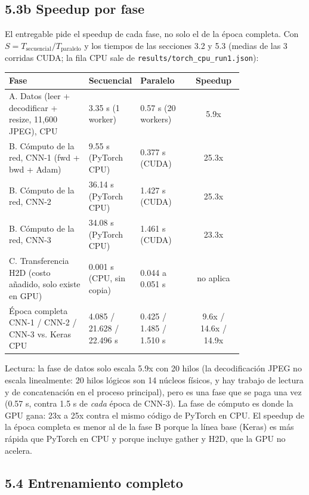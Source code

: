 \documentclass[
  11pt,
]{article}
\begin{document}
\subsection{5.3b Speedup por fase}\label{speedup-por-fase}

El entregable pide el speedup de cada fase, no solo el de la época completa. Con
\(S = T_{\text{secuencial}} / T_{\text{paralelo}}\) y los tiempos de las secciones 3.2 y 5.3
(medias de las 3 corridas CUDA; la fila CPU sale de \texttt{results/torch\_cpu\_run1.json}):

\begin{longtable}[]{@{}p{0.34\linewidth}p{0.22\linewidth}p{0.22\linewidth}c@{}}
\toprule\noalign{}
Fase & Secuencial & Paralelo & Speedup \\
\midrule\noalign{}
\endhead
\bottomrule\noalign{}
\endlastfoot
A. Datos (leer + decodificar + resize, 11,600 JPEG), CPU & 3.35 s (1 worker) & 0.57 s (20 workers) & 5.9x \\
B. Cómputo de la red, CNN-1 (fwd + bwd + Adam) & 9.55 s (PyTorch CPU) & 0.377 s (CUDA) & 25.3x \\
B. Cómputo de la red, CNN-2 & 36.14 s (PyTorch CPU) & 1.427 s (CUDA) & 25.3x \\
B. Cómputo de la red, CNN-3 & 34.08 s (PyTorch CPU) & 1.461 s (CUDA) & 23.3x \\
C. Transferencia H2D (costo añadido, solo existe en GPU) & 0.001 s (CPU, sin copia) & 0.044 a 0.051 s & no aplica \\
Época completa CNN-1 / CNN-2 / CNN-3 vs. Keras CPU & 4.085 / 21.628 / 22.496 s & 0.425 / 1.485 / 1.510 s & 9.6x / 14.6x / 14.9x \\
\end{longtable}

Lectura: la fase de datos solo escala 5.9x con 20 hilos (la decodificación JPEG no escala
linealmente: 20 hilos lógicos son 14 núcleos físicos, y hay trabajo de lectura y de
concatenación en el proceso principal), pero es una fase que se paga una vez
(0.57 s, contra 1.5 s de \emph{cada} época de CNN-3). La fase de cómputo es donde la GPU
gana: 23x a 25x contra el mismo código de PyTorch en CPU. El speedup de la época completa es
menor al de la fase B porque la línea base (Keras) es más rápida que PyTorch en CPU
y porque incluye gather y H2D, que la GPU no acelera.

\subsection{5.4 Entrenamiento completo}\label{entrenamiento-completo-y-convergencia-de-modelos}
\end{document}
